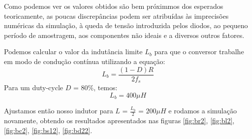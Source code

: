 \documentclass{article}
\begin{document}
Como podemos ver os valores obtidos são bem próximmos dos esperados teoricamente, as poucas discrepâncias podem ser atribuídas às imprecisões numéricas da simulação, à queda de tensão introduzida pelos diodos, ao pequeno período de amostragem, aos componentes não ideais e a diversos outros fatores.

Podemos calcular o valor da indutância limite $L_b$ para que o conversor trabalhe em modo de condução contínua utilizando a equação:
\begin{equation}
	L_b = \frac{(1 - D)R}{2f_s}
\end{equation}
Para um duty-cycle $D$ = $80\%$, temos:
\begin{equation}
	L_b = 400\mu H
\end{equation}

Ajustamos então nosso indutor para $L$ = $\frac{L_b}{2}$ = $200 \mu H$ e rodamos a simulação novamente, obtendo os resultados apresentados nas figuras \ref{fig:br2}, \ref{fig:bl2}, \ref{fig:bc2}, \ref{fig:bs12}, \ref{fig:bd22}.
\end{document}
